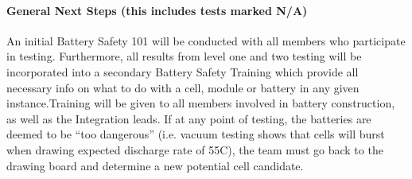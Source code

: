 \documentclass[main.tex]{subfile}
\begin{document}
    \paragraph{General Next Steps (this includes tests marked N/A)}
    An initial Battery Safety 101 will be conducted with all members who participate in testing. Furthermore, all results from level one and two testing will be incorporated into a secondary Battery Safety Training which provide all necessary info on what to do with a cell, module or battery in any given instance.Training will be given to all members involved in battery construction, as well as the Integration leads. If at any point of testing, the batteries are deemed to be “too dangerous” (i.e. vacuum testing shows that cells will burst when drawing expected discharge rate of 55C), the team must go back to the drawing board and determine a new potential cell candidate.
\end{document}
